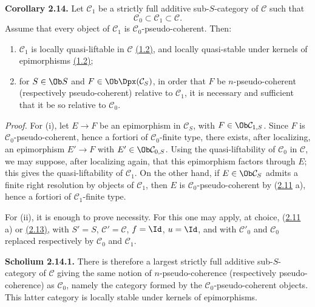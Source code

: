 \textbf{Corollary 2.14.} Let \(\mathcal C_1\) be a strictly full additive sub-\(S\)-category of \(\mathcal C\) such that
\[
  \mathcal C_0\subset \mathcal C_1\subset \mathcal C.
\]
Assume that every object of \(\mathcal C_1\) is \(\mathcal C_0\)-pseudo-coherent. Then:

\begin{enumerate}[label=(\roman*)]
\item \(\mathcal C_1\) is locally quasi-liftable in \(\mathcal C\) \hyperlink{sga6.e01.sec.1.2}{(1.2)}, and locally quasi-stable under kernels of epimorphisms \hyperlink{sga6.e01.sec.1.2}{(1.2)};
\item for \(S\in\Ob S\) and \(F\in\Ob\Dpx(\mathcal C_S)\), in order that \(F\) be \(n\)-pseudo-coherent (respectively pseudo-coherent) relative to \(\mathcal C_1\), it is necessary and sufficient that it be so relative to \(\mathcal C_0\).
\end{enumerate}

\emph{Proof.} For (i), let \(E\to F\) be an epimorphism in \(\mathcal C_S\), with \(F\in\Ob\mathcal C_{1,S}\). Since \(F\) is \(\mathcal C_0\)-pseudo-coherent, hence a fortiori of \(\mathcal C_0\)-finite type, there exists, after localizing, an epimorphism \(E'\to F\) with \(E'\in\Ob\mathcal C_{0,S}\). Using the quasi-liftability of \(\mathcal C_0\) in \(\mathcal C\), we may suppose, after localizing again, that this epimorphism factors through \(E\); this gives the quasi-liftability of \(\mathcal C_1\). On the other hand, if \(E\in\Ob\mathcal C_S\) admits a finite right resolution by objects of \(\mathcal C_1\), then \(E\) is \(\mathcal C_0\)-pseudo-coherent by (\hyperlink{sga6.e01.prop.2-11}{2.11} a), hence a fortiori of \(\mathcal C_1\)-finite type.

For (ii), it is enough to prove necessity. For this one may apply, at choice, (\hyperlink{sga6.e01.prop.2-11}{2.11} a) or \hyperlink{sga6.e01.prop.2-13}{(2.13)}, with \(S'=S\), \(\mathcal C'=\mathcal C\), \(f=\Id\), \(u=\Id\), and with \(\mathcal C'_0\) and \(\mathcal C_0\) replaced respectively by \(\mathcal C_0\) and \(\mathcal C_1\).

\textbf{Scholium 2.14.1.} There is therefore a largest strictly full additive sub-\(S\)-category of \(\mathcal C\) giving the same notion of \(n\)-pseudo-coherence (respectively pseudo-coherence) as \(\mathcal C_0\), namely the category formed by the \(\mathcal C_0\)-pseudo-coherent objects. This latter category is locally stable under kernels of epimorphisms.

